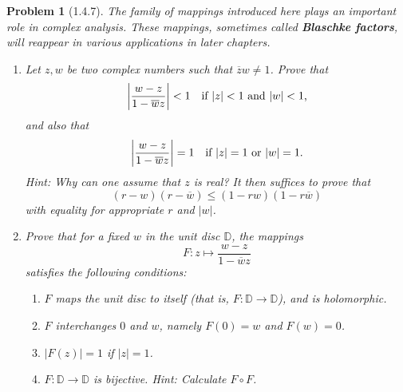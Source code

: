 \documentclass[10pt]{article}
\newcommand{\bb}[1]{\mathbb{#1}}
\newcommand{\conj}[1]{\overline{#1}}
\theoremstyle{plain}
\newtheorem{problem}{Problem}
\theoremstyle{remark}
\begin{document}
\begin{problem}[1.4.7]
  The family of mappings introduced here plays an important role in complex
  analysis. These mappings, sometimes called \textbf{Blaschke factors},
  will reappear in various applications in later chapters.
  \begin{enumerate}
  \item[(a)] Let $z,w$ be two complex numbers such that $\conj{z}w\neq 1$.
    Prove that
    \[
      \left|
        \frac{w-z}{1-\conj{w}z}
      \right|
      <1 \text{\quad if $|z|<1$ and $|w| <1$,}
    \]
    and also that
    \[
      \left|
        \frac{w-z}{1-\conj{w}z}
      \right|
      = 1 \text{\quad if $|z|=1$ or $|w|=1$}.
    \]
    Hint: Why can one assume that $z$ is real? It then suffices to prove that
    \[
      (r-w)(r-\conj{w})\leq (1-rw)(1-r\conj{w})
    \]
    with equality for appropriate $r$ and $|w|$.
  \item[(b)] Prove that for a fixed $w$ in the unit disc $\bb{D}$, the mappings
    \[
      F:z\mapsto \frac{w-z}{1-\conj{w}z}
    \]
    satisfies the following conditions:
    \begin{enumerate}
    \item[(i)] $F$ maps the unit disc to itself (that is,
      $F:\bb{D}\rightarrow\bb{D}$), and is holomorphic.
    \item[(ii)] $F$ interchanges $0$ and $w$, namely $F(0)=w$ and $F(w)=0$.
    \item[(iii)] $|F(z)|=1$ if $|z|=1$.
    \item[(iv)] $F:\bb{D}\rightarrow \bb{D}$ is bijective.
      Hint: Calculate $F\circ F$.
    \end{enumerate}
  \end{enumerate}
\end{problem}
\end{document}
